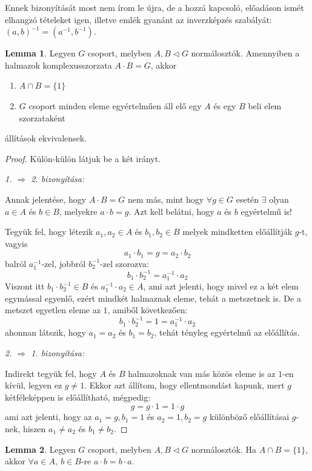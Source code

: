 \documentclass[12pt]{book}
\theoremstyle{plain} %
\theoremstyle{definition} %
\newtheorem{lem/}{Lemma}[section]
\newenvironment{lem}
  {\renewcommand{\qedsymbol}{$\clubsuit$}%
   \pushQED{\qed}\begin{lem/}}
  {\popQED\end{lem/}}
\theoremstyle{remark}
\renewcommand\qedsymbol{$\blacksquare$}
\numberwithin{equation}{section}  %
\begin{document}
	Ennek bizonyítását most nem írom le újra, de a hozzá kapcsoló, előadáson ismét elhangzó tételeket igen, illetve emlék gyanánt az inverzképzés szabályát: $(a,b)^{-1} = (a^{-1}, b^{-1})$.
	
	\begin{lem}\label{dirlem1}
		Legyen $G$ csoport, melyben $A,B\triangleleft G$ normálosztók. Amennyiben a halmazok komplexusszorzata $A\cdot B = G$, akkor
		\begin{enumerate}
			\item{$A\cap B = \{1\}$}
			\item{$G$ csoport minden eleme egyértelműen áll elő egy $A$ és egy $B$ beli elem szorzataként}
		\end{enumerate}
		állítások ekvivalensek.
	\end{lem}

	\begin{proof} Külön-külön látjuk be a két irányt.
		
		\textit{1. $\Rightarrow$ 2. bizonyítása:}
		
		Annak jelentése, hogy $A\cdot B = G$ nem más, mint hogy $\forall g\in G$ esetén $\exists$ olyan $a\in A$ és $b\in B$, melyekre $a\cdot b=g$. Azt kell belátni, hogy $a$ és $b$ egyértelmű is!
		
		Tegyük fel, hogy létezik $a_1,a_2\in A$ és $b_1,b_2\in B$ melyek mindketten előállítják $g$-t, vagyis
		\[ a_1\cdot b_1 = g = a_2 \cdot b_2  \]
		balról $a_1^{-1}$-zel, jobbról $b_2^{-1}$-zel szorozva:
		\[ b_1\cdot b_2^{-1} = a_1^{-1} \cdot a_2 \]
		Viszont itt $b_1\cdot b_2^{-1} \in B$ és $a_1^{-1} \cdot a_2\in A$, ami azt jelenti, hogy mivel ez a két elem egymással egyenlő, ezért mindkét halmaznak eleme, tehát a metszetnek is. De a metszet egyetlen eleme az $1$, amiből következően:
		\[ b_1\cdot b_2^{-1} = 1 = a_1^{-1}\cdot a_2 \]
		ahonnan látszik, hogy $a_1=a_2$ és $b_1=b_2$, tehát tényleg egyértelmű az előállítás.
		
		\textit{2. $\Rightarrow$ 1. bizonyítása:}
		
		Indirekt tegyük fel, hogy $A$ és $B$ halmazoknak van más közös eleme is az $1$-en kívül, legyen ez $g\neq 1$. Ekkor azt állítom, hogy ellentmondást kapunk, mert $g$ kétféleképpen is előállítható, mégpedig:
		\[ g = g\cdot 1 = 1 \cdot g  \]
		ami azt jelenti, hogy az $a_1=g, b_1=1$ és $a_2=1, b_2=g$ különböző előállításai $g$-nek, hiszen $a_1\neq a_2$ és $b_1\neq b_2$.
	\end{proof}

	\begin{lem}\label{dirlem2}
		Legyen $G$ csoport, melyben $A,B\triangleleft G$ normálosztók. Ha $A\cap B = \{1\}$, akkor $\forall a\in A,\ b\in B$-re $a\cdot b = b\cdot a$.
	\end{lem}
\end{document}
